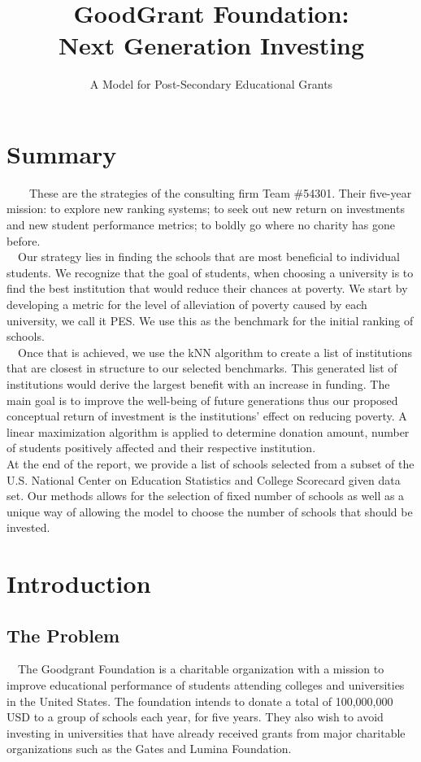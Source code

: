 \documentclass[12pt]{scrartcl}
\title{\vspace{-1.7cm} GoodGrant Foundation: \\Next Generation Investing }
\subtitle{A Model for Post-Secondary Educational Grants\vspace{-1.3cm}}
\begin{document}
\maketitle
\thispagestyle{fancy}

\section*{Summary}
	
	\ \ \ \ These are the strategies of the consulting firm Team \#54301. Their five-year mission: to explore new ranking systems; to seek out new return on investments and new student performance metrics; to boldly go where no charity has gone before.\\
	
	\ \ Our strategy lies in finding the schools that are most beneficial to individual students. We recognize that the goal of students, when choosing a university is to find the best institution that would reduce their chances at poverty. We start by developing a metric for the level of alleviation of poverty caused by each university, we call it PES. We use this as the benchmark for the initial ranking of schools.\\ 

	\ \ Once that is achieved, we use the kNN algorithm to create a list of institutions that are closest in structure to our selected benchmarks. This generated list of institutions would derive the largest benefit with an increase in funding. The main goal is to improve the well-being of future generations thus our proposed conceptual return of investment is the institutions' effect on reducing poverty.  A linear maximization algorithm is applied to determine donation amount, number of students positively affected and their respective institution. \\
	
At the end of the report, we provide a list of schools selected from a subset of the U.S. National Center on Education Statistics and College Scorecard given data set. Our methods allows for the selection of fixed number of schools as well as a unique way of allowing the model to choose the number of schools that should be invested. \\
\newpage
\tableofcontents
\newpage
	

\section{Introduction}
	\subsection{The Problem}
		\ \ The Goodgrant Foundation is a charitable organization with a mission to improve educational performance of students attending colleges and universities in the United States. The foundation intends to donate a total of 100,000,000 USD to a group of schools each year, for five years. They also wish to avoid investing in universities that have already received grants from major charitable organizations such as the Gates and Lumina Foundation.\\
		
\end{document}
